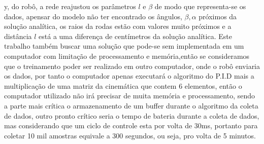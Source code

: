 y, do robô, a rede reajustou os parâmetros $l$ e $\beta$ de modo que
representa-se os dados, apensar do modelo não ter encontrado os ângulos,
$\beta, \alpha$ próximos da solução analítica, os raios da rodas estão
com valores muito próximos e a distância $l$ está a uma diferença de
centímetros da solução analítica. Este trabalho também buscar uma solução
que pode-se sem implementada em um computador com limitação de
processamento e memória,então se consideramos que o treinamento poder ser
realizado em outro computador, onde o robô enviaria os dados,
por tanto o computador apenas executará o algoritmo do  P.I.D mais a
multiplicação de uma matriz da cinemática que contem 6 elementos, então
o computador utilizado não irá precisar de muita memória e processamento,
sendo a parte mais crítica o armazenamento de um buffer durante o algoritmo
da coleta de dados, outro pronto crítico seria o tempo de bateria durante
a coleta de dados, mas considerando que um ciclo de controle esta por volta
de 30ms, portanto para coletar 10 mil amostras equivale a 300 segundos, ou
seja, pro volta de 5 minutos.